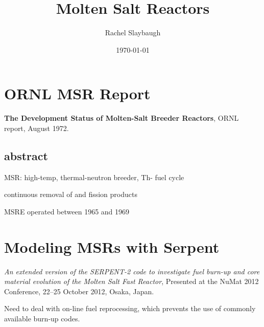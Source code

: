 \documentclass[12pt,twoside]{article}
\date{\today}
\title{Molten Salt Reactors}
\author{Rachel Slaybaugh}
\begin{document}
\maketitle

\section*{ORNL MSR Report}
\textbf{The Development Status of Molten-Salt Breeder Reactors}, ORNL report,
August 1972.

\subsection*{abstract}
\begin{compactitem}
\item MSR: high-temp, thermal-neutron breeder, Th- fuel cycle
\item continuous removal of  and fission products
\item MSRE operated between 1965 and 1969
\end{compactitem}

\section*{Modeling MSRs with Serpent}
\textit{An extended version of the SERPENT-2 code to investigate fuel burn-up and core material evolution of the Molten Salt Fast Reactor}, Presented at the NuMat 2012 Conference, 22–25 October 2012, Osaka, Japan.

Need to deal with on-line fuel reprocessing, which prevents the use of commonly available burn-up codes. 
\end{document}

